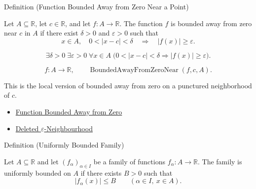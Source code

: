 \begin{definitionbox}{Definition (Function Bounded Away from Zero Near a Point)}
\begin{definition}
\label{def:function-bounded-away-from-zero-near}
Let \(A\subseteq\mathbb{R}\), let \(c\in\mathbb{R}\), and let
\(f:A\to\mathbb{R}\).  The function \(f\) is bounded away from zero near
\(c\) in \(A\) if there exist \(\delta>0\) and \(\varepsilon>0\) such that
\[
  x\in A,\quad 0<|x-c|<\delta
  \quad\Longrightarrow\quad
  |f(x)|\geq\varepsilon.
\]
\end{definition}
\end{definitionbox}

\begin{remark*}
\[
  \exists\delta>0\;\exists\varepsilon>0\;\forall x\in A\;
  \bigl(0<|x-c|<\delta\Rightarrow |f(x)|\geq\varepsilon\bigr).
\]
\end{remark*}

\begin{remark*}
\[
  f\colon A\to\mathbb{R},\qquad\operatorname{BoundedAwayFromZeroNear}(f,c,A).
\]
\end{remark*}

\begin{remark*}[Interpretation]
This is the local version of bounded away from zero on a punctured
neighborhood of \(c\).
\end{remark*}

\begin{dependencies}
\begin{itemize}
  \item \hyperref[def:function-bounded-away-from-zero]{Function Bounded Away from Zero}
  \item \hyperref[def:deleted-epsilon-neighbourhood]{Deleted \(\varepsilon\)-Neighbourhood}
\end{itemize}
\end{dependencies}

\begin{definitionbox}{Definition (Uniformly Bounded Family)}
\begin{definition}
\label{def:uniformly-bounded-family}
Let \(A\subseteq\mathbb{R}\) and let \((f_\alpha)_{\alpha\in I}\) be a
family of functions \(f_\alpha:A\to\mathbb{R}\).  The family is uniformly
bounded on \(A\) if there exists \(B>0\) such that
\[
  |f_\alpha(x)|\leq B
  \qquad (\alpha\in I,\ x\in A).
\]
\end{definition}
\end{definitionbox}

